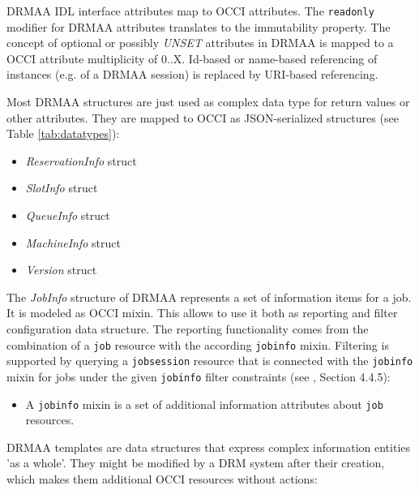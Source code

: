 \documentclass[10pt]{article}
\newcommand{\h}[1]{\lstinline|#1|}
\begin{document}
DRMAA IDL interface attributes map to OCCI attributes. The \h{readonly} modifier for DRMAA attributes translates to the immutability property. The concept of optional or possibly \emph{UNSET} attributes in DRMAA is mapped to a OCCI attribute multiplicity of 0..X. Id-based or name-based referencing of instances (e.g. of a DRMAA session) is replaced by URI-based referencing.


Most DRMAA structures are just used as complex data type for return values or other attributes. They are mapped to OCCI as JSON-serialized structures (see Table \ref{tab:datatypes}):

\begin{itemize}
\item \emph{ReservationInfo} struct
\item \emph{SlotInfo} struct
\item \emph{QueueInfo} struct 
\item \emph{MachineInfo} struct
\item \emph{Version} struct 
\end{itemize}


The \emph{JobInfo} structure of DRMAA represents a set of information items for a job. It is modeled as OCCI mixin. This allows to use it both as reporting and filter configuration data structure. The reporting functionality comes from the combination of a \h{job} resource with the according \h{jobinfo} mixin. Filtering is supported by querying a \h{jobsession} resource that is connected with the \h{jobinfo} mixin for jobs under the given \h{jobinfo} filter constraints (see \cite{gfd183}, Section 4.4.5):

\begin{itemize}
\item A \h{jobinfo} mixin is a set of additional information attributes about \h{job} resources.
\end{itemize}

DRMAA templates are data structures that express complex information entities 'as a whole'. They might be modified by a DRM system after their creation, which makes them additional OCCI resources without actions:
\end{document}
